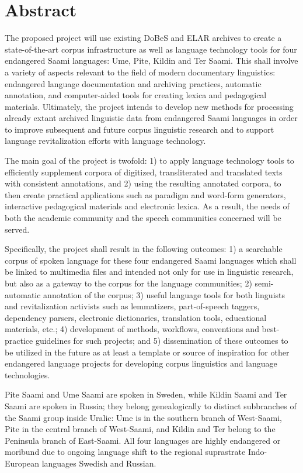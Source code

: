\documentclass[a4paper,12pt]{article}
\begin{document}
\section{Abstract} %
The proposed project will use existing DoBeS and ELAR archives to create a state-of-the-art corpus infrastructure as well as language technology tools for four endangered Saami languages: Ume, Pite, Kildin and Ter Saami. This shall involve a variety of aspects relevant to the field of modern documentary linguistics: endangered language documentation and archiving practices, automatic annotation, and computer-aided tools for creating lexica and pedagogical materials. Ultimately, the project intends to develop new methods for processing already extant archived linguistic data from endangered Saami languages in order to improve subsequent and future corpus linguistic research and to support language revitalization efforts with language technology.

The main goal of the project is twofold: 1) to apply language technology tools to efficiently supplement corpora of digitized, transliterated and translated texts with consistent annotations, and 2) using the resulting annotated corpora, to then create practical applications such as paradigm and word-form generators, interactive pedagogical materials and electronic lexica. As a result, the needs of both the academic community and the speech communities concerned will be served.

Specifically, the project shall result in the following outcomes: 1) a searchable corpus of spoken language for these four endangered Saami languages which shall be linked to multimedia files and intended not only for use in linguistic research, but also as a gateway to the corpus for the language communities; 2) semi-automatic annotation of the corpus; 3) useful language tools for both linguists and revitalization activists such as lemmatizers, part-of-speech taggers, dependency parsers, electronic dictionaries, translation tools, educational materials, etc.; 4) development of methods, workflows, conventions and best-practice guidelines for such projects; and 5) dissemination of these outcomes to be utilized in the future as at least a template or source of inspiration for other endangered language projects for developing corpus linguistics and language technologies.

Pite Saami and Ume Saami are spoken in Sweden, while Kildin Saami and Ter Saami are spoken in Russia; they belong genealogically to distinct subbranches of the Saami group inside Uralic: Ume is in the southern branch of West-Saami, Pite in the central branch of West-Saami, and Kildin and Ter belong to the Peninsula branch of East-Saami. All four languages are highly endangered or moribund due to ongoing language shift to the regional suprastrate Indo-European languages Swedish and Russian.
\end{document}
